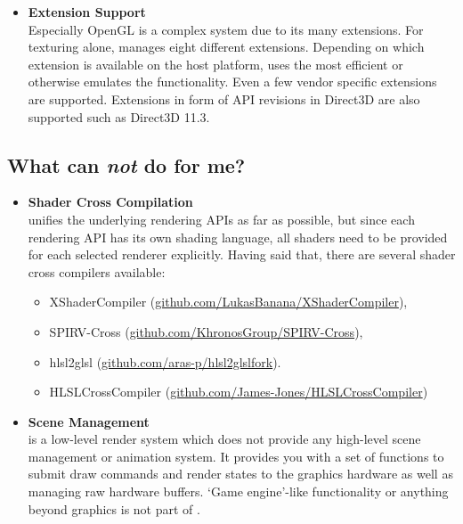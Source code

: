 \documentclass{article}
\begin{document}
\begin{itemize}
	\item \textbf{Extension Support} \\
	Especially OpenGL is a complex system due to its many extensions.
	For texturing alone, \LLGL manages eight different extensions.
	Depending on which extension is available on the host platform, \LLGL uses the most efficient or otherwise emulates the functionality.
	Even a few vendor specific extensions are supported. Extensions in form of API revisions in Direct3D are also supported such as Direct3D 11.3.
\end{itemize}


\subsection{What can \LLGL \emph{not} do for me?}

\begin{itemize}
	\item \textbf{Shader Cross Compilation} \\
	\LLGL unifies the underlying rendering APIs as far as possible, but since each rendering API has its own shading language,
	all shaders need to be provided for each selected renderer explicitly.
	Having said that, there are several shader cross compilers available:
	\begin{itemize}
	\item XShaderCompiler (\href{https://github.com/LukasBanana/XShaderCompiler}{github.com/LukasBanana/XShaderCompiler}),
	\item SPIRV-Cross (\href{https://github.com/KhronosGroup/SPIRV-Cross}{github.com/KhronosGroup/SPIRV-Cross}),
	\item hlsl2glsl (\href{https://github.com/aras-p/hlsl2glslfork}{github.com/aras-p/hlsl2glslfork}).
	\item HLSLCrossCompiler (\href{https://github.com/James-Jones/HLSLCrossCompiler}{github.com/James-Jones/HLSLCrossCompiler})
	\end{itemize}

	\item \textbf{Scene Management} \\
	\LLGL is a low-level render system which does not provide any high-level scene management or animation system.
	It provides you with a set of functions to submit draw commands and render states to the graphics hardware as well as managing raw hardware buffers.
	`Game engine'-like functionality or anything beyond graphics is not part of \LLGL.
\end{itemize}
\end{document}
